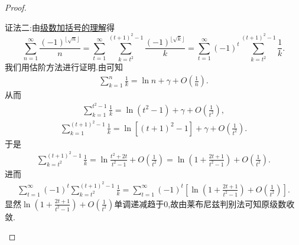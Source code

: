 \documentclass[../../main.tex]{subfiles}%
\begin{document}
\begin{proof}
\begin{enumerate}[(1)]
{\color{blue}证法二:}由\hyperref[theorem:级数加括号的理解]{级数加括号的理解}得
\[
\sum_{n=1}^{\infty}{\frac{(-1)^{\lfloor \sqrt{n} \rfloor}}{n}}=\sum_{t=1}^{\infty}{\sum_{k=t^2}^{(t+1)^2-1}{\frac{\left( -1 \right) ^{\lfloor \sqrt{k} \rfloor}}{k}}}=\sum_{t=1}^{\infty}{\left( -1 \right) ^t\sum_{k=t^2}^{(t+1)^2-1}{\frac{1}{k}}}.
\]
我们用估阶方法进行证明.由可知
\begin{align*}
\sum_{k=1}^n{\frac{1}{k}}=\ln n+\gamma +O\left( \frac{1}{n} \right) .
\end{align*}
从而
\begin{align*}
\sum_{k=1}^{t^2-1}{\frac{1}{k}}=\ln \left( t^2-1 \right) +\gamma +O\left( \frac{1}{t^2} \right) ,
\end{align*}
\begin{align*}
\sum_{k=1}^{\left( t+1 \right) ^2-1}{\frac{1}{k}}=\ln \left[ \left( t+1 \right) ^2-1 \right] +\gamma +O\left( \frac{1}{t^2} \right) .
\end{align*}
于是
\begin{align*}
\sum_{k=t^2}^{\left( t+1 \right) ^2-1}{\frac{1}{k}}=\ln \frac{t^2+2t}{t^2-1}+O\left( \frac{1}{t^2} \right) =\ln \left( 1+\frac{2t+1}{t^2-1} \right) +O\left( \frac{1}{t^2} \right) .
\end{align*}
进而
\begin{align*}
\sum_{t=1}^{\infty}{\left( -1 \right) ^t\sum_{k=t^2}^{(t+1)^2-1}{\frac{1}{k}}}=\sum_{t=1}^{\infty}{\left( -1 \right) ^t\left[ \ln \left( 1+\frac{2t+1}{t^2-1} \right) +O\left( \frac{1}{t^2} \right) \right]}.
\end{align*}
显然$\ln \left( 1+\frac{2t+1}{t^2-1} \right) +O\left( \frac{1}{t^2} \right)$单调递减趋于$0$,故由莱布尼兹判别法可知原级数收敛.


\end{enumerate}
\end{proof}
\end{document}
